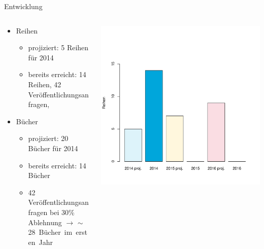 \documentclass[final]{beamer}
\begin{document}
\begin{frame}{}
\begin{columns}[t]
\begin{column}{.45\linewidth}
    \begin{block}{Entwicklung}
      \begin{columns}
      \begin{column}{.70\textwidth}
	\begin{itemize}
	  \item Reihen
	    \begin{itemize}
	      \item projiziert: 5 Reihen f{\"u}r 2014
	      \item bereits erreicht: 14 Reihen, 42 Ver{\"o}ffentlichungsanfragen, 
	    \end{itemize} 
	  \item B{\"u}cher
	    \begin{itemize}
	      \item projiziert: 20 B{\"u}cher f{\"u}r 2014
	      \item bereits erreicht: 14 B{\"u}cher
	      \item 42 Ver{\"o}ffentlichungsanfragen bei 30\% Ablehnung $\to$ \mbox{$\sim$28 B{\"u}cher im ersten Jahr}
	    \end{itemize}
	\end{itemize} 
	\end{column}
      \begin{column}{.26\textwidth}
	  \includegraphics[width=\textwidth]{reihen.pdf} \\

\end{column}
\end{columns}
\end{block}
\end{column}
\end{columns}
\end{frame}
\end{document}
